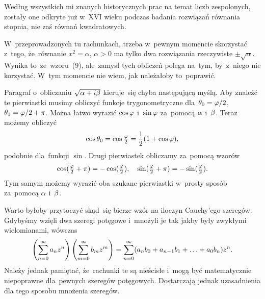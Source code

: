 \documentclass[a4paper,11pt]{article}
\begin{document}
\start {} Według wszystkich mi znanych historycznych prac na
temat liczb zespolonych, zostały one odkryte już w~XVI wieku podczas
badania rozwiązań równania  stopnia, nie zaś równań
kwadratowych. 

\vspace{\spaceFour}


\start {} W~przeprowadzonych tu rachunkach, trzeba w~pewnym
momencie skorzystać z~tego, że~równanie $x^{ 2 } = \alpha$,
$\alpha > 0$ ma tylko dwa rozwiązania rzeczywiste
$\pm \sqrt{ \alpha }$. Wynika to~ze~wzoru~(9), ale~zamysł tych
obliczeń polega na~tym, by~z~niego nie korzystać. W~tym momencie nie
wiem, jak należałoby to~poprawić.

\vspace{\spaceFour}


\start {} Paragraf o~obliczaniu $\sqrt{ \alpha + i \beta }$
kieruje~się chyba następującą myślą. Aby znaleźć te pierwiastki musimy
obliczyć funkcje trygonometryczne dla~$\theta_{ 0 } = \varphi / 2$,
$\theta_{ 1 } = \varphi / 2 + \pi$. Można łatwo wyrazić $\cos \varphi$
i~$\sin \varphi$ za~pomocą $\alpha$ i~$\beta$. Teraz możemy obliczyć
\begin{equation}
  \label{eq:6}
  \begin{split}
    \cos \theta_{ 0 } = \cos \tfrac{ \varphi }{ 2 } = \frac{ 1 }{ 2 } ( 1 + \cos
    \varphi ),
  \end{split}
\end{equation}
podobnie dla~funkcji $\sin$. Drugi pierwiastek obliczamy za~pomocą
wzorów
\begin{equation}
  \label{eq:7}
  \begin{split}
    \cos( \tfrac{ \varphi }{ 2 } + \pi ) = -\cos( \tfrac{ \varphi }{ 2 } ), \quad
    \sin( \tfrac{ \varphi }{ 2 } + \pi ) = -\sin( \tfrac{ \varphi }{ 2 } ).
  \end{split}
\end{equation}
Tym samym możemy wyrazić oba szukane pierwiastki w~prosty sposób
za~pomocą $\alpha$ i~$\beta$.

\vspace{\spaceFour}


\start {} Warto byłoby przytoczyć skąd~się bierze wzór na
iloczyn Cauchy'ego szeregów. Gdybyśmy wzięli dwa szeregi potęgowe
i~mnożyli je tak jakby były zwykłymi wielomianami, wówczas
\begin{equation}
  \label{eq:8}
  \begin{split}
    \left( \sum\limits_{ n = 0 }^{ \infty } a_{ n } z^{ n } \right) \left(
      \sum\limits_{ m = 0 }^{ \infty } b_{ m } z^{ m } \right) = \sum\limits_{ n = 0
    }^{ \infty } ( a_{ n } b_{ 0 } + a_{ n - 1 } b_{ 1 } + \ldots + a_{ 0
    } b_{ n } ) z^{ n }.
  \end{split}
\end{equation}
Należy jednak pamiętać, że~rachunki te są nieścisłe i~mogą być
matematycznie niepoprawne dla~pewnych szeregów potęgowych. Dostarczają
jednak uzasadnienia dla tego sposobu mnożenia szeregów.
\end{document}
